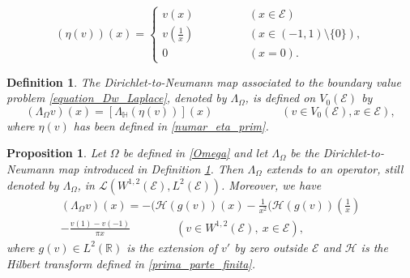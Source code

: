 \documentclass[10pt,a4paper]{amsart}
\newtheorem{proposition}{Proposition}
\newtheorem{definition}{Definition}
\begin{document}
\begin{equation}\label{numar_eta_prim}
(\eta(v))(x)=\begin{cases}
    v(x) & \qquad\qquad(x\in \mathcal{E})\\
    v\left(\frac1x\right) & \qquad\qquad(x\in (-1,1)\setminus \{0\}),\\
    0 & \qquad\qquad(x=0).
\end{cases}
\end{equation}

\begin{definition}\label{from_definition}
The Dirichlet-to-Neumann
map associated to the boundary value problem \eqref{equation_Dw_Laplace},
denoted by $\Lambda_\Omega$, is defined on $V_0(\mathcal{E})$ by
\begin{equation}\label{l_restrans}
(\Lambda_\Omega v)(x)=\left[\Lambda_\mathbb{H} (\eta(v))\right](x) \qquad\qquad\qquad(v\in V_0(\mathcal{E}), x\in \mathcal{E}),
\end{equation}
where $\eta(v)$ has been defined in \eqref{numar_eta_prim}.
\end{definition}

\begin{proposition}\label{formula_hilbert}
Let $\Omega$ be defined in  \eqref{Omega} and let $\Lambda_\Omega$ be the Dirichlet-to-Neumann map
introduced in Definition \ref{from_definition}.
Then $\Lambda_\Omega$ extends to an operator, still denoted by $\Lambda_\Omega$, in $\mathcal{L}(W^{1,2}(\mathcal{E}),L^2(\mathcal{E}))$. Moreover, we have
\begin{multline}\label{Mare_Formula}
\left(\Lambda_\Omega v\right)(x)=-(\mathcal{H}(g(v))(x) - \frac{1}{x^2} (\mathcal{H}(g(v))\left(\frac1x\right)\\
-\frac{v(1)-v(-1)}{\pi x} \qquad\qquad(v\in W^{1,2}(\mathcal{E}),\ x\in \mathcal{E}),
\end{multline}
where  $g(v)\in L^2(\mathbb{R})$ is the extension of $v'$ by zero outside $\mathcal{E}$ and $\mathcal{H}$ is the Hilbert transform defined in \eqref{prima_parte_finita}.
\end{proposition}
\end{document}

